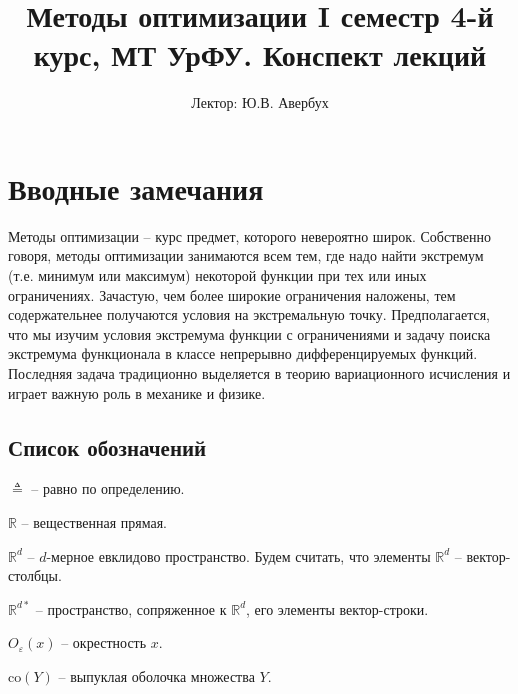 \documentclass[a4paper,12pt]{report}
\begin{document}
\title{Методы оптимизации I семестр 4-й курс, МТ УрФУ. Конспект лекций}
\author{Лектор: Ю.В. Авербух}
\maketitle

\newcommand{\rd}{\mathbb{R}^d}
\newcommand{\rdc}{\mathbb{R}^{d*}}

\chapter*{Вводные замечания}

Методы оптимизации -- курс предмет, которого невероятно широк. Собственно говоря, методы оптимизации занимаются всем тем, где надо найти экстремум (т.е. минимум или максимум)  некоторой функции при тех или иных ограничениях. Зачастую, чем более широкие ограничения наложены, тем содержательнее получаются условия на экстремальную точку. Предполагается, что мы изучим условия экстремума функции с ограничениями и задачу поиска экстремума функционала в классе непрерывно дифференцируемых функций. Последняя задача традиционно выделяется в теорию вариационного исчисления и играет важную роль в механике и физике.

\section*{Список обозначений}
\noindent $\triangleq$ -- равно по определению.

\noindent $\mathbb{R}$ -- вещественная прямая.

\noindent $\mathbb{R}^d$ -- $d$-мерное евклидово пространство. Будем считать, что элементы $\mathbb{R}^d$ -- вектор-столбцы.

\noindent $\mathbb{R}^{d*}$ -- пространство, сопряженное к $\mathbb{R}^d$, его элементы вектор-строки.

\noindent $O_\varepsilon(x)$ -- окрестность $x$.

\noindent $\mathrm{co}(Y)$ -- выпуклая оболочка множества $Y$. 
\end{document}
